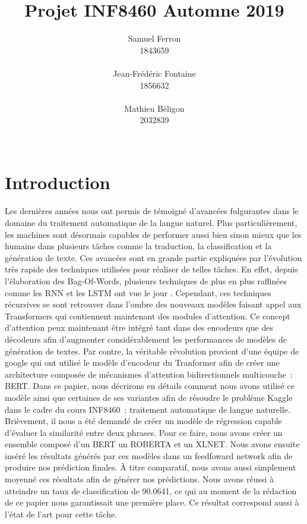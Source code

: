 \documentclass[11pt,a4paper, french]{article}
\title{Projet INF8460 Automne 2019 }
\author{Samuel Ferron \\
  1843659 \\
  {\tt } \\\And
  Jean-Frédéric Fontaine \\
  1856632 \\
  {\tt} \\\And
  Mathieu B\'eligon \\
  2032839\\
  {\tt } \\}
\date{}
\begin{document}
\maketitle

\section{Introduction}

Les dernières années nous ont permis de témoigné d’avancées fulgurantes dans le domaine du traitement automatique de la langue naturel. Plus particulièrement, les machines sont désormais capables de performer aussi bien sinon mieux que les humains dans plusieurs tâches comme la traduction, la classification et la génération de texte. Ces avancées sont en grande partie expliquées par l’évolution très rapide des techniques utilisées pour réaliser de telles tâches. En effet, depuis l’élaboration des Bag-Of-Words, plusieurs techniques de plus en plus raffinées comme les RNN et les LSTM ont vue le jour \cite{lstm}. Cependant, ces techniques récursives se sont retrouver dans l’ombre des nouveaux modèles faisant appel aux Transformers qui contiennent maintenant des modules d’attention. Ce concept d’attention peux maintenant être intégré tant dans des encodeurs que des décodeurs afin d’augmenter considérablement les performances de modèles de génération de textes. Par contre, la véritable révolution provient d’une équipe de google qui ont utilisé le modèle d’encodeur du Tranformer afin de créer une architecture composée de mécanismes d’attention bidirectionnels multicouche : BERT. Dans ce papier, nous décrirons en détails comment nous avons utilisé ce modèle ainsi que certaines de ses variantes afin de résoudre le problème Kaggle dans le cadre du cours INF8460 : traitement automatique de langue naturelle. Brièvement, il nous a été demandé de créer un modèle de régression capable d’évaluer la similarité entre deux phrases. Pour ce faire, nous avons créer un ensemble composé d’un BERT un ROBERTA et un XLNET. Nous avons ensuite inséré les résultats générés par ces modèles dans un feedfoward network afin de produire nos prédiction finales. À titre comparatif, nous avons aussi simplement moyenné ces résultats afin de générer nos prédictions. Nous avons réussi à atteindre un taux de classification de 90.0641, ce qui au moment de la rédaction de ce papier nous garantissait une première place. Ce résultat correspond aussi à l'état de l'art pour cette tâche. 
\end{document}
